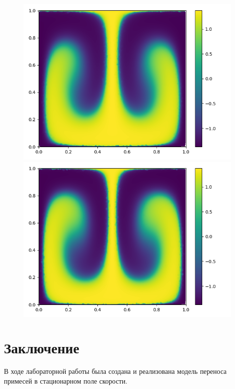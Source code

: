 \documentclass[a4paper, 14pt]{extarticle}
\begin{document}
		\begin{figure}[H]
			\begin{minipage}{0.5\textwidth}
				\centering
				\includegraphics[width = \linewidth]{9.png}
			\end{minipage}\hfill
			\begin{minipage}{0.5\textwidth}
				\centering
				\includegraphics[width = \linewidth]{10.png}
			\end{minipage}\hfill
		\end{figure}
		
	\section{Заключение}
		В ходе лабораторной работы была создана и реализована модель переноса примесей в стационарном поле скорости.
\end{document}
